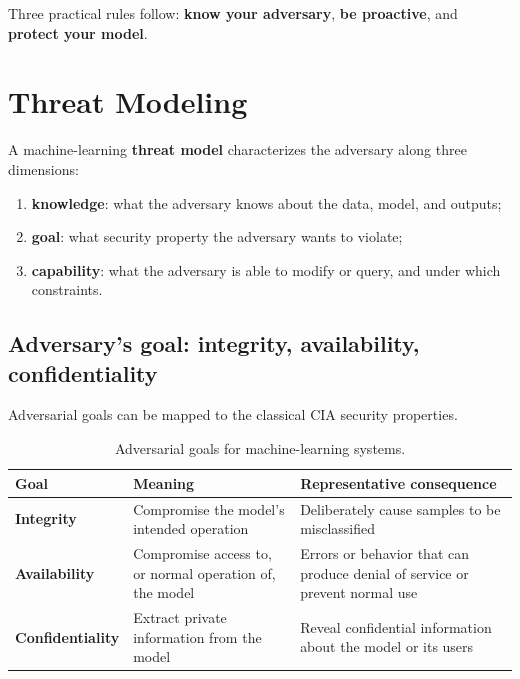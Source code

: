 \documentclass[11pt,a4paper]{report}
\begin{document}
Three practical rules follow: \textbf{know your adversary}, \textbf{be proactive}, and \textbf{protect your model}.

\section{Threat Modeling}

\begin{definitionbox}
A machine-learning \textbf{threat model} characterizes the adversary along three dimensions:
\begin{enumerate}
  \item \textbf{knowledge}: what the adversary knows about the data, model, and outputs;
  \item \textbf{goal}: what security property the adversary wants to violate;
  \item \textbf{capability}: what the adversary is able to modify or query, and under which constraints.
\end{enumerate}
\end{definitionbox}

\subsection{Adversary's goal: integrity, availability, confidentiality}

Adversarial goals can be mapped to the classical CIA security properties.

\begin{table}[H]
\centering
\caption{Adversarial goals for machine-learning systems.}
\label{tab:cia-ml}
\begin{tabularx}{\textwidth}{>{\bfseries}p{}X X}
\toprule
\rowcolor{Primary}
\color{white}Goal & \color{white}Meaning & \color{white}Representative consequence \\
\midrule
Integrity & Compromise the model's intended operation & Deliberately cause samples to be misclassified \\
Availability & Compromise access to, or normal operation of, the model & Errors or behavior that can produce denial of service or prevent normal use \\
Confidentiality & Extract private information from the model & Reveal confidential information about the model or its users \\
\bottomrule
\end{tabularx}
\end{table}
\end{document}
